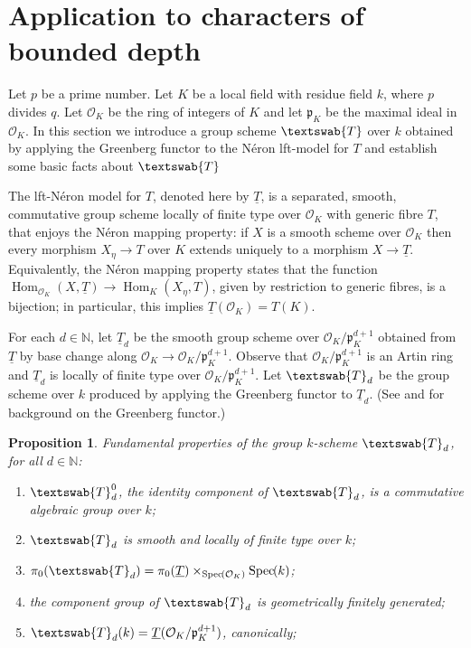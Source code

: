 \documentclass[11pt]{amsart}
\makeatletter
\theoremstyle{plain}
\newtheorem{proposition}[theorem]{Proposition}
\theoremstyle{definition}
\theoremstyle{remark}
\newcommand{\Spec}[1]{{\operatorname{Spec}\hskip-1pt( #1 )}}
\newcommand{\NN}{{\mathbb{N}}}
\newcommand{\OK}{\mathcal{O}_K}
\newcommand{\pK}{\mathfrak{p}_K}
\newcommand{\Fq}{k}
\DeclareMathOperator{\Hom}{Hom}
\newcommand{\GN}[1]{\textswab{#1}}
\newcommand{\TT}{\underline{T}}
\newcommand{\labitem}[2]{%
\def\@itemlabel{\textbf{#1}}
\item
\def\@currentlabel{#1}\label{#2}}
\makeatother
\begin{document}
\section{Application to characters of bounded depth}

%
Let $p$ be a prime number. Let $K$ be a local field with residue field $\Fq$, where $p$ divides $q$. Let $\OK$ be the ring of integers of $K$ and let $\pK$ be the maximal ideal in $\OK$.
%
In this section we introduce a group scheme $\GN{T}$ over $\Fq$ obtained by applying the Greenberg functor to the N\'eron lft-model for $T$ and establish some basic facts about $\GN{T}$


The lft-N\'eron model for $T$, denoted here by $\TT$, is a separated, smooth, commutative group scheme locally of finite type over $\OK$ with generic fibre $T$, that enjoys the N\'eron mapping property: if $X$ is a smooth scheme over $\OK$ then every morphism $X_\eta \to T$ over $K$ extends uniquely to a morphism $X \to \TT$. Equivalently, the N\'eron mapping property states that the function $\Hom_{\OK} (X,\TT) \to \Hom_K(X_\eta,T)$, given by restriction to generic fibres, is a bijection; in particular, this implies $\TT(\OK) = T(K)$.

For each $d\in \NN$, let $\TT_{d}$ be the smooth group scheme over $\OK/\pK^{d+1}$ obtained from $\TT$ by base change along $\OK \to \OK/\pK^{d+1}$. Observe that $\OK/\pK^{d+1}$ is an Artin ring and $\TT_{d}$ is locally of finite type over $\OK/\pK^{d+1}$. 
%
Let $\GN{T}_{d}$ be the group scheme over $\Fq$ produced by applying the Greenberg functor to $\TT_{d}$. (See \cite{Greenberg:2} and \cite[Ch. 9, \S 6]{BLR} for background on the Greenberg functor.) 

\begin{proposition}\label{prop:GN}
Fundamental properties of the group $\Fq$-scheme $\GN{T}_d$, for all $d\in \NN$:
\begin{enumerate}
 \labitem{(GNd.0)}{GN0} $\GN{T}_d^0$, the identity component of $\GN{T}_d$, is a commutative algebraic group over $\Fq$;
\labitem{(GNd.1)}{GNd} $\GN{T}_d$ is smooth and locally of finite type over $\Fq$;
\labitem{(GNd.2)}{pi0} $\pi_0(\GN{T}_d) = \pi_0(\TT) \times_{\Spec{\OK}} \Spec{\Fq}$;
\labitem{(GNd.3)}{fg} the component group of $\GN{T}_d$ is geometrically finitely generated;
\labitem{(GNd.4)}{dFq} $\GN{T}_d(\Fq) = \TT(\OK/\pK^{d+1})$, canonically;
\end{enumerate}
\end{proposition}
\end{document}

